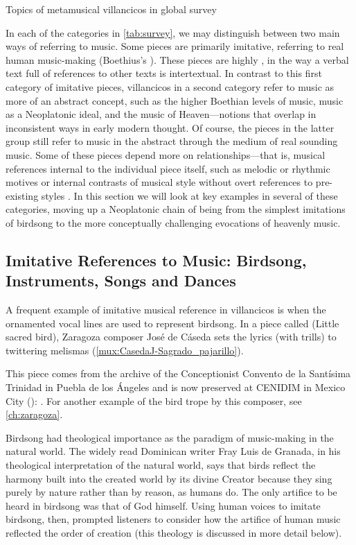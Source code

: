{Topics of metamusical villancicos in global survey}

In each of the categories in \cref{tab:survey}, we may distinguish between two
main ways of referring to music.  
Some pieces are primarily imitative, referring to real human music-making
(Boethius's ).
These pieces are highly , in the way a verbal text full of
references to other texts is intertextual.
In contrast to this first category of imitative pieces, villancicos in a second
category refer to music as more of an abstract concept, such as the higher
Boethian levels of music, music as a Neoplatonic ideal, and the music of
Heaven---notions that overlap in inconsistent ways in early modern thought.
Of course, the pieces in the latter group still refer to music in the abstract
through the medium of real sounding music.  
Some of these pieces depend more on  relationships---that
is, musical references internal to the individual piece itself, such as melodic
or rhythmic motives or internal contrasts of musical style without overt
references to pre-existing styles .
In this section we will look at key examples in several of these categories,
moving up a Neoplatonic chain of being from the simplest imitations of birdsong
to the more conceptually challenging evocations of heavenly music.

\subsection{Imitative References to Music: Birdsong, Instruments, Songs and
Dances}

A frequent example of imitative musical reference in villancicos is when the
ornamented vocal lines are used to represent birdsong.
In a piece called  (Little sacred bird), Zaragoza
composer José de Cáseda sets the lyrics  (with trills) to
twittering melismas (\cref{mux:CasedaJ-Sagrado_pajarillo}).%
\begin{Footnote} 
    This piece comes from the archive of the Conceptionist Convento de la
    Santísima Trinidad in Puebla de los Ángeles and is now preserved at CENIDIM
    in Mexico City (): 
    \autocite{Tello:SanchezGarzaCatalogo}.
    For another example of the bird trope by this composer, see
    \cref{ch:zaragoza}.
\end{Footnote}
Birdsong had theological importance as the paradigm of music-making in the
natural world.
The widely read Dominican writer Fray Luis de Granada, in his theological
interpretation of the natural world, says that birds reflect the harmony built
into the created world by its divine Creator because they sing purely by nature
rather than by reason, as humans do.%
    \Autocite{LuisdeGranada:Simbolo} %
The only artifice to be heard in birdsong was that of God himself.
Using human voices to imitate birdsong, then, prompted listeners to consider
how the artifice of human music reflected the order of creation (this theology
is discussed in more detail below). 

